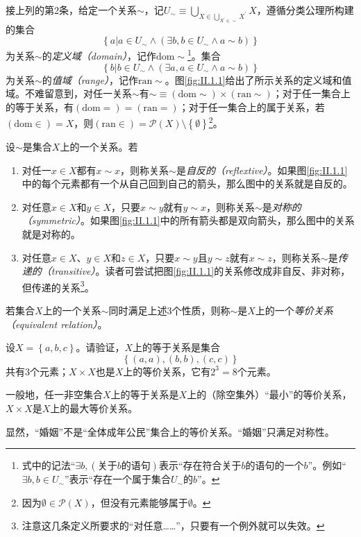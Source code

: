 \documentclass[../main.tex]{subfiles}
\begin{document}
接上列的第2条，给定一个关系$\sim$，记$U_\sim\equiv\bigcup_{X\in\bigcup_{X^\prime\in\sim}X^\prime}X$，遵循分类公理所构建的集合
\[
    \left\{a|a\in U_\sim\wedge\left(\exists b,b\in U_\sim\wedge a\sim b\right)\right\}
\]
为关系$\sim$的\emph{定义域（domain）}，记作$\mathrm{dom}\sim$\footnote{式中的记法“$\exists b,\left(\text{关于$b$的语句}\right)$表示“存在符合关于$b$的语句的一个$b$”。例如“$\exists b,b\in U_\sim$”表示“存在一个属于集合$U_\sim$的$b$”。}。集合
\[
    \left\{b|b\in U_\sim\wedge \left(\exists a,a\in U_\sim\wedge a\sim b\right)\right\}
\]
为关系$\sim$的\emph{值域（range）}，记作$\mathrm{ran}\sim$。图\ref{fig:II.1.1}给出了所示关系的定义域和值域。不难留意到，对任一关系$\sim$有$\sim\equiv\left(\mathrm{dom}\sim\right)\times\left(\mathrm{ran}\sim\right)$；对于任一集合上的等于关系，有$\left(\mathrm{dom}=\right)=\left(\mathrm{ran}=\right)$；对于任一集合上的属于关系，若$\left(\mathrm{dom}\in\right)=X$，则$\left(\mathrm{ran}\in\right)=\mathcal{P}\left(X\right)\setminus\left\{\emptyset\right\}$\footnote{因为$\emptyset\in\mathcal{P}\left(X\right)$，但没有元素能够属于$\emptyset$。}。

设$\sim$是集合$X$上的一个关系。若
\begin{enumerate}
    \item 对任一$x\in X$都有$x\sim x$，则称关系$\sim$是\emph{自反的（reflextive）}。如果图\ref{fig:II.1.1}中的每个元素都有一个从自己回到自己的箭头，那么图中的关系就是自反的。
    \item 对任意$x\in X$和$y\in X$，只要$x\sim y$就有$y\sim x$，则称关系$\sim$是\emph{对称的（symmetric）}。如果图\ref{fig:II.1.1}中的所有箭头都是双向箭头，那么图中的关系就是对称的。
    \item 对任意$x\in X$、$y\in X$和$z\in X$，只要$x\sim y\text{且}y\sim z$就有$x\sim z$，则称关系$\sim$是\emph{传递的（transitive）}。读者可尝试把图\ref{fig:II.1.1}的关系修改成非自反、非对称，但传递的关系\footnote{注意这几条定义所要求的“对任意……”，只要有一个例外就可以失效。}。
\end{enumerate}
若集合$X$上的一个关系$\sim$同时满足上述3个性质，则称$\sim$是$X$上的一个\emph{等价关系（equivalent relation）}。

\begin{example}
    设$X=\left\{a,b,c\right\}$。请验证，$X$上的等于关系是集合
    \[
        \left\{\left(a,a\right),\left(b,b\right),\left(c,c\right)\right\}
    \]
    共有3个元素；$X\times X$也是$X$上的等价关系，它有$2^3=8$个元素。

    一般地，任一非空集合$X$上的等于关系是$X$上的（除空集外）“最小”的等价关系，$X\times X$是$X$上的最大等价关系。

    显然，“婚姻”不是“全体成年公民”集合上的等价关系。“婚姻”只满足对称性。
\end{example}
\end{document}
